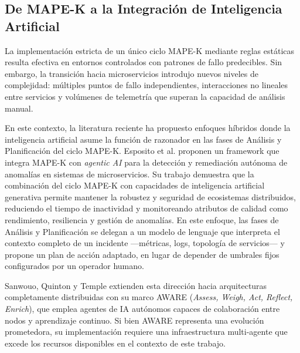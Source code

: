 \subsection{De MAPE-K a la Integraci\'{o}n de Inteligencia Artificial}\label{sec:mapek-ia}

La implementaci\'{o}n estricta de un \'{u}nico ciclo MAPE-K mediante reglas est\'{a}ticas resulta efectiva en entornos controlados con patrones de fallo predecibles. Sin embargo, la transici\'{o}n hacia microservicios introdujo nuevos niveles de complejidad: m\'{u}ltiples puntos de fallo independientes, interacciones no lineales entre servicios y vol\'{u}menes de telemetr\'{i}a que superan la capacidad de an\'{a}lisis manual.

En este contexto, la literatura reciente ha propuesto enfoques h\'{i}bridos donde la inteligencia artificial asume la funci\'{o}n de razonador en las fases de An\'{a}lisis y Planificaci\'{o}n del ciclo MAPE-K. Esposito et al. \cite{esposito2025mapek} proponen un framework que integra MAPE-K con \textit{agentic AI} para la detecci\'{o}n y remediaci\'{o}n aut\'{o}noma de anomal\'{i}as en sistemas de microservicios. Su trabajo demuestra que la combinaci\'{o}n del ciclo MAPE-K con capacidades de inteligencia artificial generativa permite mantener la robustez y seguridad de ecosistemas distribuidos, reduciendo el tiempo de inactividad y monitoreando atributos de calidad como rendimiento, resiliencia y gesti\'{o}n de anomal\'{i}as. En este enfoque, las fases de An\'{a}lisis y Planificaci\'{o}n se delegan a un modelo de lenguaje que interpreta el contexto completo de un incidente ---m\'{e}tricas, logs, topolog\'{i}a de servicios--- y propone un plan de acci\'{o}n adaptado, en lugar de depender de umbrales fijos configurados por un operador humano.

Sanwouo, Quinton y Temple \cite{sanwouo2025aware} extienden esta direcci\'{o}n hacia arquitecturas completamente distribuidas con su marco AWARE (\textit{Assess, Weigh, Act, Reflect, Enrich}), que emplea agentes de IA aut\'{o}nomos capaces de colaboraci\'{o}n entre nodos y aprendizaje continuo. Si bien AWARE representa una evoluci\'{o}n prometedora, su implementaci\'{o}n requiere una infraestructura multi-agente que excede los recursos disponibles en el contexto de este trabajo.


